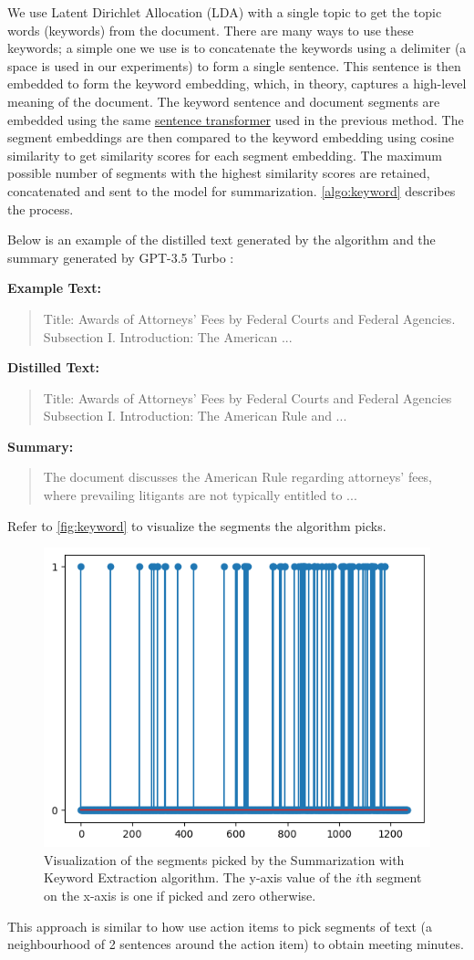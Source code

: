 We use Latent Dirichlet Allocation (LDA) \cite{blei2003latent} with a single topic to get the topic words (keywords) from the document.
There are many ways to use these keywords; a simple one we use is to concatenate the keywords using a delimiter (a space is used in our experiments) to form a single sentence.
This sentence is then embedded to form the keyword embedding, which, in theory, captures a high-level meaning of the document.
The keyword sentence and document segments are embedded using the same \href{https://huggingface.co/sentence-transformers/all-MiniLM-L6-v2}{sentence transformer} used in the previous method.
The segment embeddings are then compared to the keyword embedding using cosine similarity to get similarity scores for each segment embedding.
The maximum possible number of segments with the highest similarity scores are retained, concatenated and sent to the model for summarization.
\autoref{algo:keyword} describes the process.

Below is an example of the distilled text generated by the algorithm and the summary generated by GPT-3.5 Turbo \cite{brown2020language}:

\noindent \textbf{Example Text:}
\begin{quote}
  Title: Awards of Attorneys' Fees by Federal Courts and Federal Agencies. Subsection I. Introduction: The American ...
\end{quote}

\noindent \textbf{Distilled Text:}
\begin{quote}
  Title: Awards of Attorneys' Fees by Federal Courts and Federal Agencies Subsection I. Introduction: The American Rule and ...
\end{quote}

\noindent \textbf{Summary:}
\begin{quote}
  The document discusses the American Rule regarding attorneys' fees, where prevailing litigants are not typically entitled to ...
\end{quote}

Refer to \autoref{fig:keyword} to visualize the segments the algorithm picks.

\begin{figure}
  \centering
  \includegraphics*[width=.45\textwidth]{images/keyword.png}
  \caption{
    Visualization of the segments picked by the Summarization with Keyword Extraction algorithm.
    The y-axis value of the $i$th segment on the x-axis is one if picked and zero otherwise.
  }
  \label{fig:keyword}
\end{figure}

This approach is similar to how \citet{golia2024action} use action items to pick segments of text (a neighbourhood of 2 sentences around the action item) to obtain meeting minutes.
